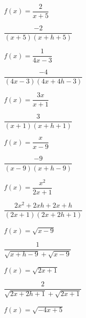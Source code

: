 \documentclass{ximera}
\begin{document}
\begin{question}
\begin{problem}
 $f(x) = \dfrac{2}{x+5}$

 \begin{solution}
     $\dfrac{-2}{(x+5)(x+h+5)}$
 \end{solution}
\end{problem}

\begin{problem}
$f(x) = \dfrac{1}{4x-3}$ 

\begin{solution}
    $\dfrac{-4}{(4x-3)(4x+4h-3)}$
\end{solution}
\end{problem} 

\begin{problem}
$f(x) = \dfrac{3x}{x+1}$  

\begin{solution}
    $\dfrac{3}{(x+1)(x+h+1)}$
\end{solution}
\end{problem}  

\begin{problem}
$f(x) = \dfrac{x}{x - 9}$  

\begin{solution}
    $\dfrac{-9}{(x - 9)(x + h - 9)}$
\end{solution}
\end{problem}

\begin{problem}
$f(x) = \dfrac{x^2}{2x+1}$  

\begin{solution}
    $\dfrac{2x^2+2xh+2x+h}{(2x+1)(2x+2h+1)}$
\end{solution}
\end{problem} 

\begin{problem}
$f(x) = \sqrt{x-9}$

\begin{solution}
$\dfrac{1}{\sqrt{x+h-9} + \sqrt{x-9}}$
\end{solution}
\end{problem}   

\begin{problem}
$f(x) = \sqrt{2x+1}$ 

\begin{solution}
    $\dfrac{2}{\sqrt{2x+2h+1} + \sqrt{2x+1}}$
\end{solution}
\end{problem}   

\begin{problem}
$f(x) = \sqrt{-4x+5}$ 


\end{problem}
\end{question}
\end{document}
